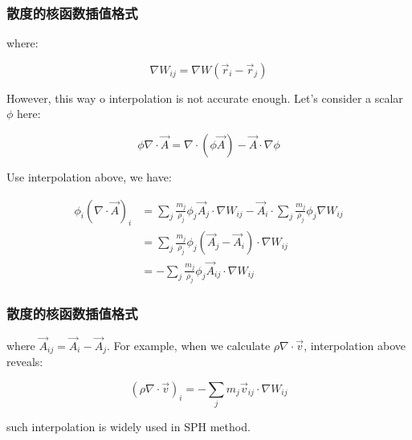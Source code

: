 \begin{frame}
    \frametitle{散度的核函数插值格式}
    where:

\begin{equation}
    \nabla W_{ij} = \nabla W(\vec{r}_i - \vec{r}_j)
\end{equation}

However, this way o interpolation is not accurate enough. 
Let's consider a scalar $\phi$ here:

\begin{equation}
    \phi \nabla\cdot \vec{A} = \nabla\cdot(\phi \vec{A}) - \vec{A}\cdot\nabla\phi
\end{equation}

Use interpolation above, we have:

\begin{equation}
    \begin{aligned}
        \phi_i (\nabla\cdot \vec{A})_i &= 
            \sum_j \frac{m_j}{\rho_j} \phi_j \vec{A}_j \cdot \nabla W_{ij} -
            \vec{A}_i\cdot\sum_j \frac{m_j}{\rho_j}  \phi_j \nabla W_{ij}\\
            &=
            \sum_j \frac{m_j}{\rho_j} \phi_j (\vec{A}_j-\vec{A}_i) \cdot \nabla W_{ij}\\
            &=
            -\sum_j \frac{m_j}{\rho_j} \phi_j \vec{A}_{ij} \cdot \nabla W_{ij}
    \end{aligned}
\end{equation}
\end{frame}

\begin{frame}
    \frametitle{散度的核函数插值格式}
    where $\vec{A}_{ij} = \vec{A}_i - \vec{A}_j$. 
For example, when we calculate $\rho \nabla\cdot\vec{v}$, interpolation above reveals:

\begin{equation}
    (\rho \nabla\cdot \vec{v})_i = -\sum_j m_j \vec{v}_{ij} \cdot \nabla W_{ij}
\end{equation}

such interpolation is widely used in SPH method.
\end{frame}

